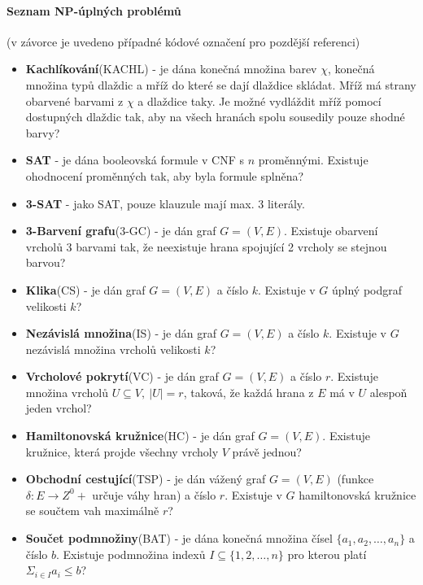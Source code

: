 \documentclass[a4paper]{article}      %
\begin{document}
\paragraph{Seznam NP-úplných problémů} (v závorce je uvedeno případné kódové označení pro pozdější referenci)
\begin{itemize}
\item \textbf{Kachlíkování}(KACHL) - je dána konečná množina barev $\chi$, konečná množina typů dlaždic a mříž do které se dají dlaždice skládat.
Mříž má strany obarvené barvami z $\chi$ a dlaždice taky. Je možné vydláždit mříž pomocí dostupných dlaždic tak,
aby na všech hranách spolu sousedily pouze shodné barvy?
\item \textbf{SAT} - je dána booleovská formule v CNF s $n$ proměnnými. Existuje ohodnocení proměnných tak, aby byla formule splněna?
\item \textbf{3-SAT} - jako SAT, pouze klauzule mají max. 3 literály.
\item \textbf{3-Barvení grafu}(3-GC) - je dán graf $G=(V,E)$. Existuje obarvení vrcholů 3 barvami tak,
že neexistuje hrana spojující 2 vrcholy se stejnou barvou?
\item \textbf{Klika}(CS) - je dán graf $G=(V,E)$ a číslo $k$. Existuje v $G$ úplný podgraf velikosti $k$?
\item \textbf{Nezávislá množina}(IS) - je dán graf $G=(V,E)$ a číslo $k$. Existuje v $G$ nezávislá množina vrcholů velikosti $k$?
\item \textbf{Vrcholové pokrytí}(VC) - je dán graf $G=(V,E)$ a číslo $r$. Existuje množina vrcholů $U\subseteq V,\ |U|=r$, taková, že každá hrana z $E$ má v $U$ alespoň jeden vrchol?
\item \textbf{Hamiltonovská kružnice}(HC) - je dán graf $G=(V,E)$. Existuje kružnice, která projde všechny vrcholy $V$ právě jednou?
\item \textbf{Obchodní cestující}(TSP) - je dán vážený graf $G=(V,E)$ (funkce $\delta:E \rightarrow Z^{0}+$ určuje váhy hran) a číslo $r$. Existuje
v $G$ hamiltonovská kružnice se součtem vah maximálně $r$?
\item \textbf{Součet podmnožiny}(BAT) - je dána konečná množina čísel $\lbrace a_1, a_2, \ldots, a_n\rbrace$ a číslo $b$.
Existuje podmnožina indexů $I \subseteq \lbrace 1,2, \ldots, n \rbrace$ pro kterou platí $\Sigma_{i\in I} a_{i} \leq b$?
\end{itemize}
\end{document}
